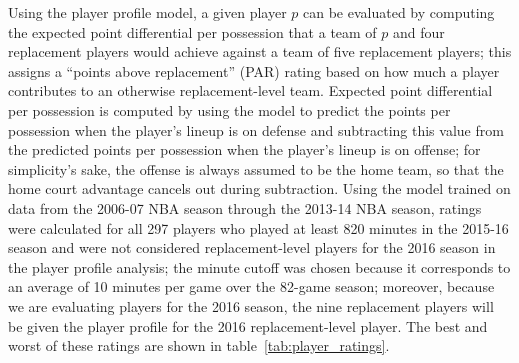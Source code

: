 Using the player profile model, a given player $p$ can be evaluated by computing the
expected point differential per possession that a team of $p$ and four replacement
players would achieve against a team of five replacement players; this assigns a
``points above replacement'' (PAR) rating based on how much a player contributes to
an otherwise replacement-level team. Expected point differential per possession is
computed by using the model to predict the points per possession when the player's
lineup is on defense and subtracting this value from the predicted points per
possession when the player's lineup is on offense; for simplicity's sake, the
offense is always assumed to be the home team, so that the home court advantage
cancels out during subtraction. Using the model trained on data from the 2006-07 NBA
season through the 2013-14 NBA season, ratings were calculated for all 297 players
who played at least 820 minutes in the 2015-16 season and were not considered
replacement-level players for the 2016 season in the player profile analysis; the
minute cutoff was chosen because it corresponds to an average of 10 minutes per game
over the 82-game season; moreover, because we are evaluating players for the
2016 season, the nine replacement players will be given the player profile for the
2016 replacement-level player. The best and worst of these ratings are shown in
table~\ref{tab:player_ratings}.

